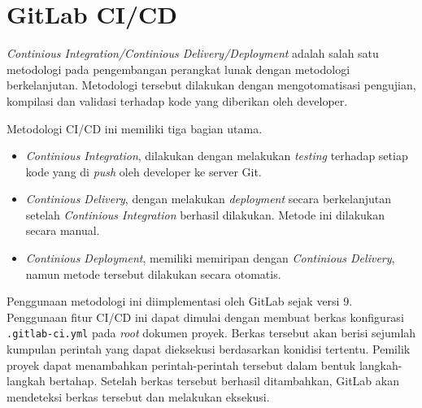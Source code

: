 \section{GitLab CI/CD}

    \textit{Continious Integration/Continious Delivery/Deployment} adalah salah
    satu metodologi pada pengembangan perangkat lunak dengan metodologi
    berkelanjutan. Metodologi tersebut dilakukan dengan mengotomatisasi
    pengujian, kompilasi dan validasi terhadap kode yang diberikan oleh
    developer\cite{gitlab-cicd:methodologies}.
    
    Metodologi CI/CD ini memiliki tiga bagian
    utama\cite{gitlab-cicd:methodologies}.
    \begin{itemize}
        \item \textit{Continious Integration}, dilakukan dengan melakukan
        \textit{testing} terhadap setiap kode yang di \textit{push} oleh
        developer ke server Git.
        
        \item \textit{Continious Delivery}, dengan melakukan \textit{deployment}
        secara berkelanjutan setelah \textit{Continious Integration} berhasil
        dilakukan. Metode ini dilakukan secara manual.
        
        \item \textit{Continious Deployment}, memiliki memiripan dengan
        \textit{Continious Delivery}, namun metode tersebut dilakukan secara
        otomatis.
    \end{itemize}
    
    Penggunaan metodologi ini diimplementasi oleh GitLab sejak versi
    9\cite{gitlab-cicd:introduction}.  Penggunaan fitur CI/CD ini dapat dimulai
    dengan membuat berkas konfigurasi \texttt{.gitlab-ci.yml} pada \textit{root}
    dokumen proyek. Berkas tersebut akan berisi sejumlah kumpulan perintah yang
    dapat dieksekusi berdasarkan konidisi tertentu. Pemilik proyek dapat
    menambahkan perintah-perintah tersebut dalam bentuk langkah-langkah
    bertahap. Setelah berkas tersebut berhasil ditambahkan, GitLab akan
    mendeteksi berkas tersebut dan melakukan eksekusi.
    
